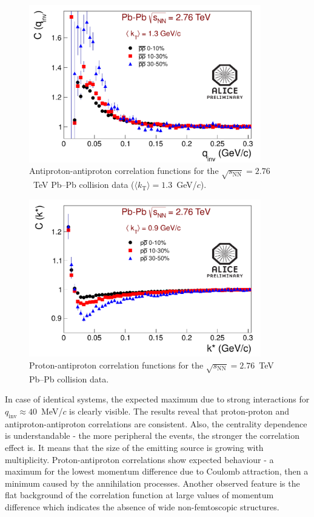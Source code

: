 \begin{figure}%
  \centering
  \includegraphics[width=0.9\textwidth]{cf_APAP_f1_kT2}
  \caption{Antiproton-antiproton correlation functions for the $\sqrt{s_{\mathrm{NN}}}=2.76$~TeV Pb--Pb collision data ($\langle k_\mathrm{T}\rangle = 1.3$~GeV/$c$).}
  \label{cfAPAPkT2}
\end{figure}
\begin{figure}%
  \centering
  \includegraphics[width=0.9\textwidth]{cf_PAP_f1}
  \caption{Proton-antiproton correlation functions for the $\sqrt{s_{\mathrm{NN}}}=2.76$~TeV Pb--Pb collision data.}
  \label{cfPAP}
\end{figure}
In case of identical systems, the expected maximum due to strong interactions for $q_{\mathrm{inv}} \approx 40$~MeV/$c$ is clearly visible. The results reveal that proton-proton and antiproton-antiproton correlations are consistent. Also, the centrality dependence is understandable - the more peripheral the events, the stronger the correlation effect is. It means that the size of the emitting source is growing with multiplicity. Proton-antiproton correlations show expected behaviour - a maximum for the lowest momentum difference due to Coulomb attraction, then a minimum caused by the annihilation processes. Another observed feature is the flat background of the correlation function at large values of momentum difference which indicates the absence of wide non-femtoscopic structures.

